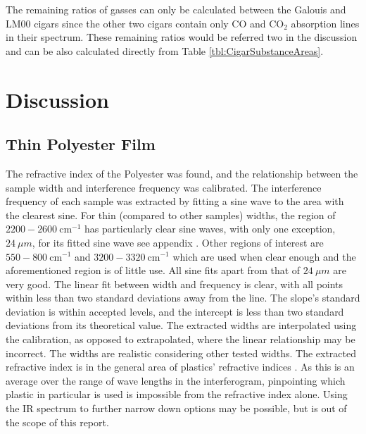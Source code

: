 \documentclass[reprint,amsmath,amssymb,aps, prl]{revtex4-2}
\begin{document}
The remaining ratios of gasses can only be calculated between the Galouis and LM00 cigars since the other two cigars contain only CO and $\text{CO}_{2}$ absorption lines in their spectrum. These remaining ratios would be referred two in the discussion and can be also calculated directly from Table \ref{tbl:CigarSubstanceAreas}.

\section{Discussion}
\subsection{Thin Polyester Film}
The refractive index of the Polyester was found, and the relationship between the sample width and interference frequency was calibrated.
The interference frequency of each sample was extracted by fitting a sine wave to the area with the clearest sine. For thin (compared to other samples) widths, the region of $2200-2600\ \text{cm}^{-1}$ has particularly clear sine waves, with only one exception, $24\ \mu m$, for its fitted sine wave see appendix .
Other regions of interest are $550-800\ \text{cm}^{-1}$ and $3200-3320\ \text{cm}^{-1}$ which are used when clear enough and the aforementioned region is of little use.
All sine fits apart from that of $24\ \mu m$ are very good.
The linear fit between width and frequency is clear, with all points within less than two standard deviations away from the line.
The slope's standard deviation is within accepted levels, and the intercept is less than two standard deviations from its theoretical value.
The extracted widths are interpolated using the calibration, as opposed to extrapolated, where the linear relationship may be incorrect. The widths are realistic considering other tested widths.
The extracted refractive index is in the general area of plastics' refractive indices \cite{plasticRefract}. As this is an average over the range of wave lengths in the interferogram, pinpointing which plastic in particular is used is impossible from the refractive index alone. Using the IR spectrum to further narrow down options may be possible, but is out of the scope of this report.
\end{document}

